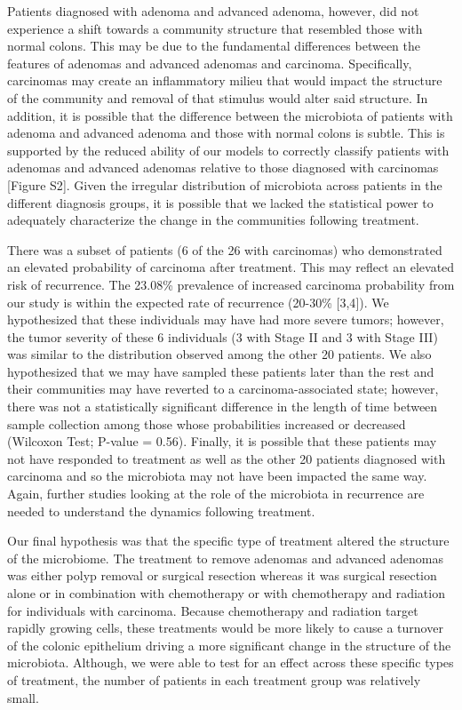 \documentclass[12pt,]{article}
\begin{document}
Patients diagnosed with adenoma and advanced adenoma, however, did not
experience a shift towards a community structure that resembled those
with normal colons. This may be due to the fundamental differences
between the features of adenomas and advanced adenomas and carcinoma.
Specifically, carcinomas may create an inflammatory milieu that would
impact the structure of the community and removal of that stimulus would
alter said structure. In addition, it is possible that the difference
between the microbiota of patients with adenoma and advanced adenoma and
those with normal colons is subtle. This is supported by the reduced
ability of our models to correctly classify patients with adenomas and
advanced adenomas relative to those diagnosed with carcinomas {[}Figure
S2{]}. Given the irregular distribution of microbiota across patients in
the different diagnosis groups, it is possible that we lacked the
statistical power to adequately characterize the change in the
communities following treatment.

There was a subset of patients (6 of the 26 with carcinomas) who
demonstrated an elevated probability of carcinoma after treatment. This
may reflect an elevated risk of recurrence. The 23.08\% prevalence of
increased carcinoma probability from our study is within the expected
rate of recurrence (20-30\% {[}3,4{]}). We hypothesized that these
individuals may have had more severe tumors; however, the tumor severity
of these 6 individuals (3 with Stage II and 3 with Stage III) was
similar to the distribution observed among the other 20 patients. We
also hypothesized that we may have sampled these patients later than the
rest and their communities may have reverted to a carcinoma-associated
state; however, there was not a statistically significant difference in
the length of time between sample collection among those whose
probabilities increased or decreased (Wilcoxon Test; P-value = 0.56).
Finally, it is possible that these patients may not have responded to
treatment as well as the other 20 patients diagnosed with carcinoma and
so the microbiota may not have been impacted the same way. Again,
further studies looking at the role of the microbiota in recurrence are
needed to understand the dynamics following treatment.

Our final hypothesis was that the specific type of treatment altered the
structure of the microbiome. The treatment to remove adenomas and
advanced adenomas was either polyp removal or surgical resection whereas
it was surgical resection alone or in combination with chemotherapy or
with chemotherapy and radiation for individuals with carcinoma. Because
chemotherapy and radiation target rapidly growing cells, these
treatments would be more likely to cause a turnover of the colonic
epithelium driving a more significant change in the structure of the
microbiota. Although, we were able to test for an effect across these
specific types of treatment, the number of patients in each treatment
group was relatively small.
\end{document}
